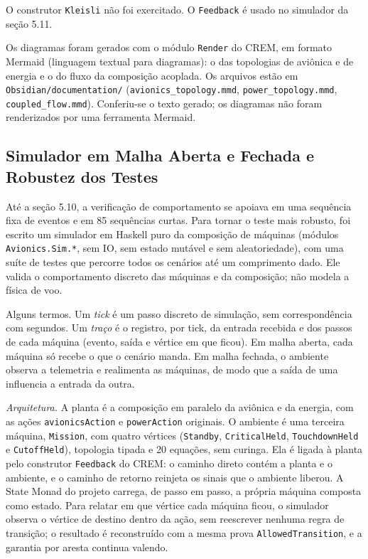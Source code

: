\documentclass[12pt,a4paper]{article}
\begin{document}
O construtor \texttt{Kleisli} não foi exercitado. O \texttt{Feedback} é usado no simulador da seção 5.11.

Os diagramas foram gerados com o módulo \texttt{Render} do CREM, em formato Mermaid (linguagem textual para diagramas): o das topologias de aviônica e de energia e o do fluxo da composição acoplada. Os arquivos estão em \texttt{Obsidian/documentation/} (\texttt{avionics\_topology.mmd}, \texttt{power\_topology.mmd}, \texttt{coupled\_flow.mmd}). Conferiu-se o texto gerado; os diagramas não foram renderizados por uma ferramenta Mermaid.

\subsection{Simulador em Malha Aberta e Fechada e Robustez dos Testes}

Até a seção 5.10, a verificação de comportamento se apoiava em uma sequência fixa de eventos e em 85 sequências curtas. Para tornar o teste mais robusto, foi escrito um simulador em Haskell puro da composição de máquinas (módulos \texttt{Avionics.Sim.*}, sem IO, sem estado mutável e sem aleatoriedade), com uma suíte de testes que percorre todos os cenários até um comprimento dado. Ele valida o comportamento discreto das máquinas e da composição; não modela a física de voo.

Alguns termos. Um \textit{tick} é um passo discreto de simulação, sem correspondência com segundos. Um \textit{traço} é o registro, por tick, da entrada recebida e dos passos de cada máquina (evento, saída e vértice em que ficou). Em malha aberta, cada máquina só recebe o que o cenário manda. Em malha fechada, o ambiente observa a telemetria e realimenta as máquinas, de modo que a saída de uma influencia a entrada da outra.

\textit{Arquitetura.} A planta é a composição em paralelo da aviônica e da energia, com as ações \texttt{avionicsAction} e \texttt{powerAction} originais. O ambiente é uma terceira máquina, \texttt{Mission}, com quatro vértices (\texttt{Standby}, \texttt{CriticalHeld}, \texttt{TouchdownHeld} e \texttt{CutoffHeld}), topologia tipada e 20 equações, sem curinga. Ela é ligada à planta pelo construtor \texttt{Feedback} do CREM: o caminho direto contém a planta e o ambiente, e o caminho de retorno reinjeta os sinais que o ambiente liberou. A State Monad do projeto carrega, de passo em passo, a própria máquina composta como estado. Para relatar em que vértice cada máquina ficou, o simulador observa o vértice de destino dentro da ação, sem reescrever nenhuma regra de transição; o resultado é reconstruído com a mesma prova \texttt{AllowedTransition}, e a garantia por aresta continua valendo.
\end{document}
